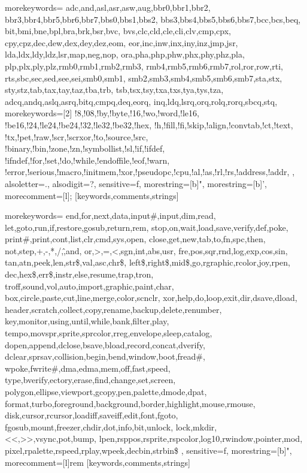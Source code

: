 \newcommand{\screentext}[1]{{\codefont\color{black}\normalsize{#1}}}
\newcommand{\screentextwide}[1]{{\codefontwide\color{black}\small{#1}}}
\newcommand{\stw}[1]{{\codefontwide\color{black}\small{#1}}}

%
  {morekeywords={%
    adc,and,asl,asr,asw,aug,bbr0,bbr1,bbr2,%
    bbr3,bbr4,bbr5,bbr6,bbr7,bbs0,bbs1,bbs2,%
    bbs3,bbs4,bbs5,bbs6,bbs7,bcc,bcs,beq,%
    bit,bmi,bne,bpl,bra,brk,bsr,bvc,%
    bvs,clc,cld,cle,cli,clv,cmp,cpx,%
    cpy,cpz,dec,dew,dex,dey,dez,eom,%
    eor,inc,inw,inx,iny,inz,jmp,jsr,%
    lda,ldx,ldy,ldz,lsr,map,neg,nop,%
    ora,pha,php,phw,phx,phy,phz,pla,%
    plp,plx,ply,plz,rmb0,rmb1,rmb2,rmb3,%
    rmb4,rmb5,rmb6,rmb7,rol,ror,row,rti,%
    rts,sbc,sec,sed,see,sei,smb0,smb1,%
    smb2,smb3,smb4,smb5,smb6,smb7,sta,stx,%
    sty,stz,tab,tax,tay,taz,tba,trb,%
    tsb,tsx,tsy,txa,txs,tya,tys,tza,%
    adcq,andq,aslq,asrq,bitq,cmpq,deq,eorq,%
    inq,ldq,lsrq,orq,rolq,rorq,sbcq,stq},%
  morekeywords=[2]{%
    !8,!08,!by,!byte,!16,!wo,!word,!le16,%
    !be16,!24,!le24,!be24,!32,!le32,!be32,!hex,%
    !h,!fill,!fi,!skip,!align,!convtab,!ct,!text,%
    !tx,!pet,!raw,!scr,!scrxor,!to,!source,!src,%
    !binary,!bin,!zone,!zn,!symbollist,!sl,!if,!ifdef,%
    !ifndef,!for,!set,!do,!while,!endoffile,!eof,!warn,%
    !error,!serious,!macro,!initmem,!xor,!pseudopc,!cpu,!al,!as,!rl,!rs,!address,!addr,
  },%
  alsoletter=.,%
  alsodigit=?,%
  sensitive=f,%
  morestring=[b]",%
  morestring=[b]',%
  morecomment=[l]{;}%
  }[keywords,comments,strings]

%
  {morekeywords={%
    end,for,next,data,input\#,input,dim,read,%
    let,goto,run,if,restore,gosub,return,rem,%
    stop,on,wait,load,save,verify,def,poke,%
    print\#,print,cont,list,clr,cmd,sys,open,%
    close,get,new,tab,to,fn,spc,then,%
    not,step,+,-,*,/,\^,and,%
    or,>,=,<,sgn,int,abs,usr,%
    fre,pos,sqr,rnd,log,exp,cos,sin,%
    tan,atn,peek,len,str\$,val,asc,chr\$,%
    left\$,right\$,mid\$,go,rgraphic,rcolor,joy,rpen,%
    dec,hex\$,err\$,instr,else,resume,trap,tron,%
    troff,sound,vol,auto,import,graphic,paint,char,%
    box,circle,paste,cut,line,merge,color,scnclr,%
    xor,help,do,loop,exit,dir,dsave,dload,%
    header,scratch,collect,copy,rename,backup,delete,renumber,%
    key,monitor,using,until,while,bank,filter,play,%
    tempo,movspr,sprite,sprcolor,rreg,envelope,sleep,catalog,%
    dopen,append,dclose,bsave,bload,record,concat,dverify,%
    dclear,sprsav,collision,begin,bend,window,boot,fread\#,%
    wpoke,fwrite\#,dma,edma,mem,off,fast,speed,%
    type,bverify,ectory,erase,find,change,set,screen,%
    polygon,ellipse,viewport,gcopy,pen,palette,dmode,dpat,%
    format,turbo,foreground,background,border,highlight,mouse,rmouse,%
    disk,cursor,rcursor,loadiff,saveiff,edit,font,fgoto,%
    fgosub,mount,freezer,chdir,dot,info,bit,unlock,%
    lock,mkdir,<<,>>,vsync,pot,bump,%
    lpen,rsppos,rsprite,rspcolor,log10,rwindow,pointer,mod,%
    pixel,rpalette,rspeed,rplay,wpeek,decbin,strbin\$%
  },%
  sensitive=f,%
  morestring=[b]",%
  morecomment=[l]{rem }%
  }[keywords,comments,strings]

